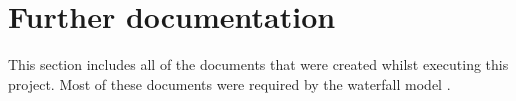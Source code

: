 \chapter{Further documentation}

This section includes all of the documents that were created whilst executing this project. Most of these documents were required by the waterfall model \cite{waterfall}.


 
 
 
 

